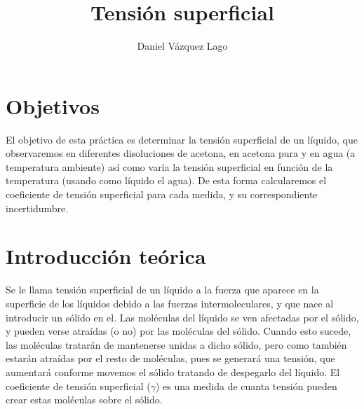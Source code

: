 \documentclass[10pt,a4paper]{article}
\author{Daniel Vázquez Lago}
\begin{document}
\title{Tensión superficial}
\maketitle \newpage
\tableofcontents \newpage
\section{Objetivos}
El objetivo de esta práctica es determinar la tensión superficial de un líquido, que observaremos en diferentes disoluciones de acetona, en acetona pura y en agua (a temperatura ambiente) así como varía la tensión superficial en función de la temperatura (usando como líquido el agua). De esta forma calcularemos el coeficiente de tensión superficial para cada medida, y su correspondiente incertidumbre.
\section{Introducción teórica}
Se le llama tensión superficial de un líquido a la fuerza que aparece en la superficie de los líquidos debido a las fuerzas intermoleculares, y que nace al introducir un sólido en el. Las moléculas del líquido se ven afectadas por el sólido, y pueden verse atraídas (o no) por las moléculas del sólido. Cuando esto sucede, las moléculas tratarán de mantenerse unidas a dicho sólido, pero como también estarán atraídas por el resto de moléculas, pues se generará una tensión, que aumentará conforme movemos el sólido tratando de despegarlo del líquido. El coeficiente de tensión superficial ($\gamma$)  es una medida de cuanta tensión pueden crear estas moléculas sobre el sólido. \\
\end{document}
